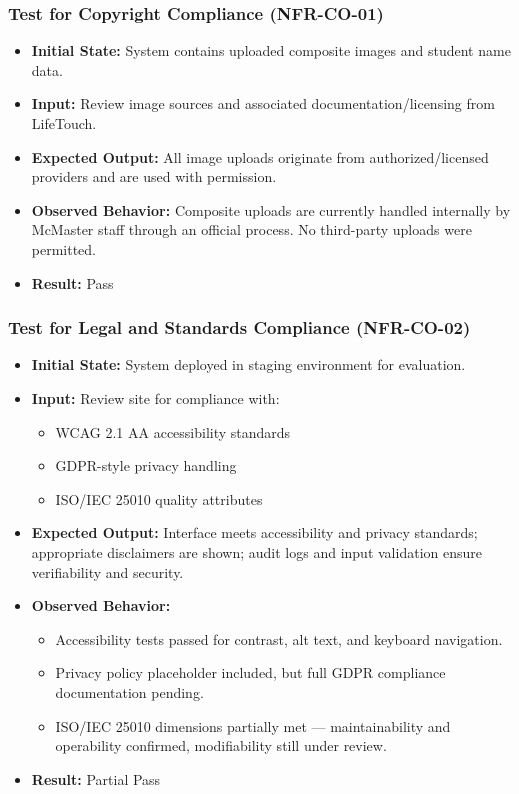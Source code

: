 \documentclass[12pt, titlepage]{article}
\begin{document}
\subsubsection{Test for Copyright Compliance (NFR-CO-01)}
\begin{itemize}
    \item \textbf{Initial State:} System contains uploaded composite images and student name data.
    \item \textbf{Input:} Review image sources and associated documentation/licensing from LifeTouch.
    \item \textbf{Expected Output:} All image uploads originate from authorized/licensed providers and are used with permission.
    \item \textbf{Observed Behavior:} Composite uploads are currently handled internally by McMaster staff through an official process. No third-party uploads were permitted.
    \item \textbf{Result:} Pass
\end{itemize}

\subsubsection{Test for Legal and Standards Compliance (NFR-CO-02)}
\begin{itemize}
    \item \textbf{Initial State:} System deployed in staging environment for evaluation.
    \item \textbf{Input:} Review site for compliance with:
    \begin{itemize}
        \item WCAG 2.1 AA accessibility standards
        \item GDPR-style privacy handling
        \item ISO/IEC 25010 quality attributes
    \end{itemize}
    \item \textbf{Expected Output:} Interface meets accessibility and privacy standards; appropriate disclaimers are shown; audit logs and input validation ensure verifiability and security.
    \item \textbf{Observed Behavior:} 
    \begin{itemize}
        \item Accessibility tests passed for contrast, alt text, and keyboard navigation.
        \item Privacy policy placeholder included, but full GDPR compliance documentation pending.
        \item ISO/IEC 25010 dimensions partially met — maintainability and operability confirmed, modifiability still under review.
    \end{itemize}
    \item \textbf{Result:} Partial Pass
\end{itemize}
\end{document}
